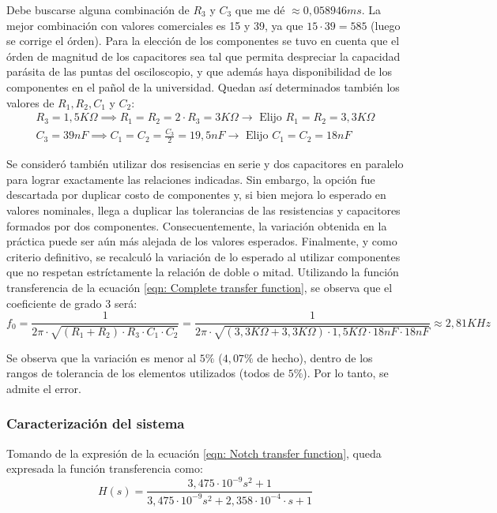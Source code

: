 Debe buscarse alguna combinaci\'on de $R_3$ y $C_3$ que me d\'e $\approx 0,058946 ms$.
La mejor combinaci\'on con valores comerciales es 15 y 39, ya que $15 \cdot 39 = 585$ (luego se corrige el \'orden).
Para la elecci\'on de los componentes se tuvo en cuenta que el \'orden de magnitud de los capacitores sea tal que permita despreciar la capacidad par\'asita de las puntas del osciloscopio, y que adem\'as haya disponibilidad de los componentes en el pa\~nol de la universidad.
Quedan as\'i determinados tambi\'en los valores de $R_1, R_2, C_1$ y $C_2$:
\begin{align}
	\label{eqn: Selection of components}
    R_3 = 1,5 K\Omega \implies R_1 = R_2 = 2 \cdot R_3 = 3 K\Omega \longrightarrow \textrm{ Elijo  } R_1 = R_2 = 3,3 K\Omega \\
    C_3 = 39 nF \implies C_1 = C_2 = \frac{C_3}{2} = 19,5 nF \longrightarrow \textrm{ Elijo  } C_1 = C_2 = 18 nF
\end{align}

Se consider\'o tambi\'en utilizar dos resisencias en serie y dos capacitores en paralelo para lograr exactamente las relaciones indicadas.
Sin embargo, la opci\'on fue descartada por duplicar costo de componentes y, si bien mejora lo esperado en valores nominales, llega a duplicar las tolerancias de las resistencias y capacitores formados por dos componentes.
Consecuentemente, la variaci\'on obtenida en la pr\'actica puede ser a\'un m\'as alejada de los valores esperados.
Finalmente, y como criterio definitivo, se recalcul\'o la variaci\'on de lo esperado al utilizar componentes que no respetan estr\'ictamente la relaci\'on de doble o mitad.
Utilizando la funci\'on transferencia de la ecuaci\'on \ref{eqn: Complete transfer function}, se observa que el coeficiente de grado 3 ser\'a:
\begin{equation}
    f_0 = \frac{1}{2\pi \cdot \sqrt{\left(R_1 + R_2\right) \cdot R_3 \cdot C_1 \cdot C_2}} = \frac{1}{2\pi \cdot \sqrt{\left(3,3 K\Omega + 3,3 K\Omega\right) \cdot 1,5 K\Omega \cdot 18 nF \cdot 18nF}} \approx 2,81 KHz
\end{equation}

Se observa que la variaci\'on es menor al $5\%$ ($4,07\%$ de hecho), dentro de los rangos de tolerancia de los elementos utilizados (todos de $5\%$).
Por lo tanto, se admite el error.



\subsubsection{Caracterizaci\'on del sistema}
Tomando de la expresi\'on de la ecuaci\'on \ref{eqn: Notch transfer function}, queda expresada la funci\'on transferencia como:
\begin{equation}
    \label{eqn: Theoretical transfer function with numbers}
    H(s) = \frac{3,475 \cdot 10^{-9} s^2 + 1}{3,475 \cdot 10^{-9} s^2 + 2,358 \cdot 10^{-4} \cdot s + 1}
\end{equation}

